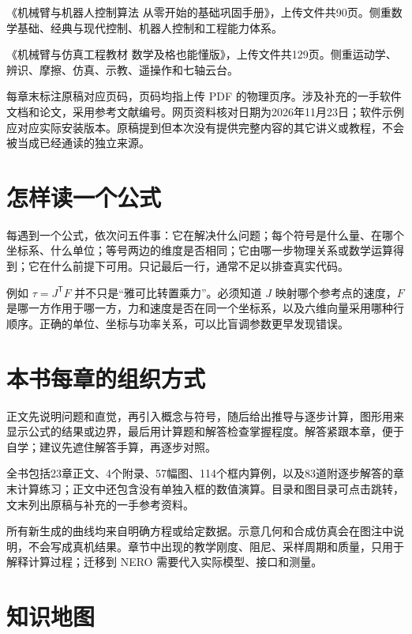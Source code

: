 \begin{description}[leftmargin=2.6em,style=nextline]
\item[原稿 A]《机械臂与机器人控制算法 从零开始的基础巩固手册》，上传文件共90页。侧重数学基础、经典与现代控制、机器人控制和工程能力体系。
\item[原稿 B]《机械臂与仿真工程教材 数学及格也能懂版》，上传文件共129页。侧重运动学、辨识、摩擦、仿真、示教、遥操作和七轴云台。
\end{description}

每章末标注原稿对应页码，页码均指上传 PDF 的物理页序。涉及补充的一手软件文档和论文，采用参考文献编号。网页资料核对日期为2026年11月23日；软件示例应对应实际安装版本。原稿提到但本次没有提供完整内容的其它讲义或教程，不会被当成已经通读的独立来源。

\section*{怎样读一个公式}

每遇到一个公式，依次问五件事：它在解决什么问题；每个符号是什么量、在哪个坐标系、什么单位；等号两边的维度是否相同；它由哪一步物理关系或数学运算得到；它在什么前提下可用。只记最后一行，通常不足以排查真实代码。

例如 $\tau=J^\mathsf TF$ 并不只是“雅可比转置乘力”。必须知道 $J$ 映射哪个参考点的速度，$F$ 是哪一方作用于哪一方，力和速度是否在同一个坐标系，以及六维向量采用哪种行顺序。正确的单位、坐标与功率关系，可以比盲调参数更早发现错误。

\section*{本书每章的组织方式}

正文先说明问题和直觉，再引入概念与符号，随后给出推导与逐步计算，图形用来显示公式的结果或边界，最后用计算题和解答检查掌握程度。解答紧跟本章，便于自学；建议先遮住解答手算，再逐步对照。

全书包括23章正文、4个附录、57幅图、114个框内算例，以及83道附逐步解答的章末计算练习；正文中还包含没有单独入框的数值演算。目录和图目录可点击跳转，文末列出原稿与补充的一手参考资料。

所有新生成的曲线均来自明确方程或给定数据。示意几何和合成仿真会在图注中说明，不会写成真机结果。章节中出现的教学刚度、阻尼、采样周期和质量，只用于解释计算过程；迁移到 NERO 需要代入实际模型、接口和测量。

\section*{知识地图}

